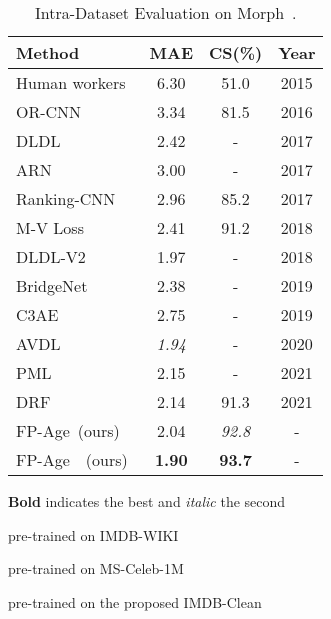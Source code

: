 \begin{table}[tb] 
	\caption{Intra-Dataset Evaluation on Morph~\cite{ricanekMORPHLongitudinalImage2006}.}\label{tab:morph-results-s3}
	\begin{center}
    	\begin{threeparttable}
    		\begin{tabular}{l|c|c|c}
    			\toprule
    			{Method} & {MAE}   & {CS(\%)} &{Year} \\
    			\midrule
    			\midrule
    			Human workers~\cite{niuOrdinalRegressionMultiple2016} & 6.30 & 51.0  & 2015 \\
    	    	OR-CNN~\cite{niuOrdinalRegressionMultiple2016} & 3.34 & 81.5 & 2016 \\		
    			DLDL~\cite{gaoDeepLabelDistribution2017}  & 2.42 & - & 2017 \\
    			ARN~\cite{agustssonAnchoredRegressionNetworks2017} & 3.00 & - & 2017 \\	    			Ranking-CNN~\cite{chenUsingRankingCNNAge2017}\tnote{}  & 2.96 & 85.2 & 2017 \\
    			M-V Loss\cite{panMeanVarianceLossDeep2018} & 2.41 & 91.2 & 2018 \\
    			DLDL-V2~\cite{gaoAgeEstimationUsing2018}\tnote{}  & {1.97} & - & 2018 \\
    			BridgeNet~\cite{liBridgeNetContinuityAwareProbabilistic2019}\tnote{} & 2.38 & - & 2019 \\
    			C3AE~\cite{zhangC3AEExploringLimits2019}\tnote{} & 2.75 & - & 2019 \\
    			AVDL~\cite{wenAdaptiveVarianceBased2020}\tnote{} & \textit{1.94} & - & 2020 \\
    			PML~\cite{dengPMLProgressiveMargin2021} & {2.15} & -  &  {2021} \\ 
    			DRF~\cite{shenDeepDifferentiableRandom2021} & 2.14 & 91.3 & 2021 \\ 
    			\midrule
    			FP-Age~(ours) & 2.04& \textit{92.8} &{-} \\
    			FP-Age\tnote{}~~(ours) & \textbf{1.90} & \textbf{93.7} &{-} \\
    			\bottomrule
    		\end{tabular}
    	
	
    	\begin{tablenotes}
    	\item \textbf{Bold} indicates the best and \textit{italic} the second
    	\item  pre-trained on IMDB-WIKI
    	\item  pre-trained on MS-Celeb-1M
    	\item  pre-trained on the proposed IMDB-Clean 
    	\end{tablenotes}
    	\end{threeparttable}
	\end{center}
\end{table}

